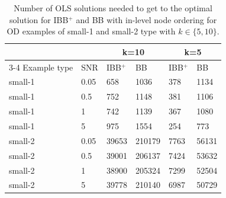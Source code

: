 \documentclass[10pt, letterpaper]{article}
\begin{document}
\begin{table}
\centering
\caption{Number of OLS solutions needed to get to the optimal solution for IBB$^{+}$ and BB with in-level node ordering for OD examples of small-1 and small-2 type with $k\in \{5,10 \}$.\label{tab:ols_calls_ibb_vs_bb}}
\begin{tabular}{l l l l l l}
\hline
& &\multicolumn{2}{c}{k=10} & \multicolumn{2}{c}{k=5} \\
\cline{3-4}\cline{5-6}%
Example type & SNR & IBB$^{+}$  &   BB  &  IBB$^{+}$  &  BB \\
\hline
small-1 & 0.05  &    658    &    1036  &  378   &     1134 \\
   small-1 & 0.5   &    752    &    1148  &  381   &     1106 \\
    small-1 & 1    &    742    &    1139  &  367   &     1080 \\
    small-1 & 5    &    975    &    1554  &  254   &      773  \\
    small-2 & 0.05  &    39653   &  210179  & 7763   &  56131  \\ 
    small-2 & 0.5   &    39001   &  206137  &  7424  &  53632  \\
    small-2 & 1     &    38900   &  205324  &  7299  &  52504  \\
    small-2 & 5     &    39778   &  210140  &  6987  &  50729  \\
\hline
\end{tabular}
\end{table}
\end{document}
